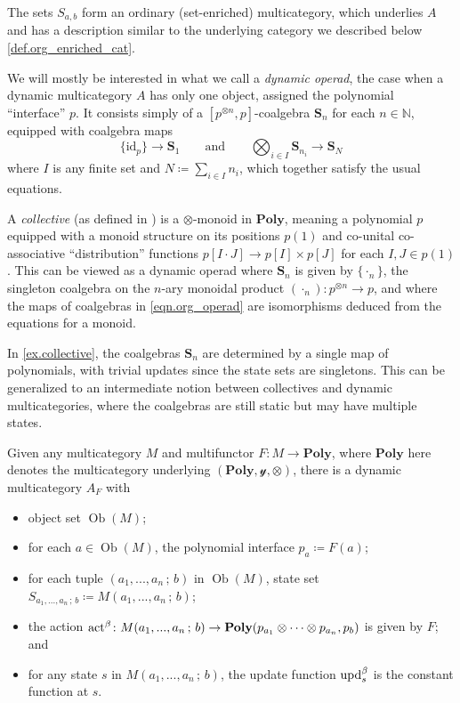\documentclass{eptcs}
\theoremstyle{definition}
\theoremstyle{plain}
\newenvironment{example}
  {\pushQED{\qed}\renewcommand{\qedsymbol}{$\lozenge$}\examplex}
  {\popQED\endexamplex}
\DeclareMathOperator{\ob}{Ob}
\newcommand{\Cat}[1]{\textbf{#1}}%
\newcommand{\id}{\mathrm{id}}
\newcommand{\tn}[1]{\textnormal{#1}}
\newcommand{\nn}{\mathbb{N}}
\newcommand{\act}{\tn{act}}
\newcommand{\upd}{\tn{upd}}
\newcommand{\yon}{\mathcal{y}}
\newcommand{\poly}{\Cat{Poly}}
\newcommand{\0}{\textsf{0}}
\newcommand{\1}{\tn{\textsf{1}}}
\newcommand{\qqand}{\qquad\text{and}\qquad}
\renewcommand{\S}{{\Cat{S}}}
\newcommand{\idcoalg}[1]{{\{\id_{#1}\}}}
\begin{document}
The sets $S_{a,b}$ form an ordinary (set-enriched) multicategory, which underlies $A$ and has a description similar to the underlying category we described below \cref{def.org_enriched_cat}. 

We will mostly be interested in what we call a \emph{dynamic operad}, the case when a dynamic multicategory $A$ has only one object, assigned the polynomial ``interface'' $p$. It consists simply of a $[p^{\otimes n},p]$-coalgebra $\S_n$ for each $n \in \nn$, equipped with coalgebra maps
\begin{equation}\label{eqn.org_operad}
\idcoalg{p} \to \S_1
\qqand
\bigotimes_{i\in I} \S_{n_i} \to \S_N
\end{equation}
where $I$ is any finite set and $N\coloneqq\sum_{i\in I}n_i$, which together satisfy the usual equations. 

\begin{example}\label{ex.collective}
A \emph{collective} (as defined in \cite{niu2021collectives}) is a $\otimes$-monoid in $\poly$, meaning a polynomial $p$ equipped with a monoid structure on its positions $p(1)$ and co-unital co-associative ``distribution'' functions $p[I \cdot J] \to p[I] \times p[J]$ for each $I,J \in p(1)$. This can be viewed as a dynamic operad where $\S_n$ is given by $\{\cdot_n\}$, the singleton coalgebra on the $n$-ary monoidal product $(\cdot_n)\colon p^{\otimes n} \to p$, and where the maps of coalgebras in \eqref{eqn.org_operad} are isomorphisms deduced from the equations for a monoid.
\end{example}

\begin{example}
In \cref{ex.collective}, the coalgebras $\S_n$ are determined by a single map of polynomials, with trivial updates since the state sets are singletons. This can be generalized to an intermediate notion between collectives and dynamic multicategories, where the coalgebras are still static but may have multiple states.

Given any multicategory $M$ and multifunctor $F\colon M \to\poly$, where $\poly$ here denotes the multicategory underlying $(\poly,\yon,\otimes)$, there is a dynamic multicategory $A_F$ with 
\begin{itemize}
	\item object set $\ob(M)$;
	\item for each $a \in \ob(M)$, the polynomial interface $p_a \coloneqq F(a)$;
	\item for each tuple $(a_1,...,a_n\,;\,b)$ in $\ob(M)$, state set $S_{a_1,...,a_n\,;\,b} \coloneqq M(a_1,...,a_n\,;\,b)$;
	\item the action $\act^\beta\colon M(a_1,...,a_n\,;\,b) \to \poly(p_{a_1} \otimes \cdots \otimes p_{a_n},p_b)$ is given by $F$; and 
	\item for any state $s$ in $M(a_1,...,a_n\,;\,b)$, the update function $\upd^\beta_s$ is the constant function at $s$.
	\qedhere
\end{itemize}
\end{example}
\end{document}
